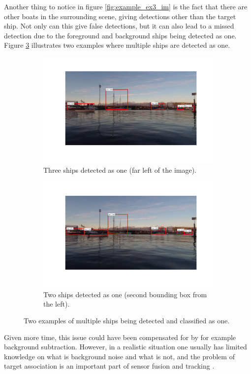 Another thing to notice in figure \ref{fig:example_ex3_im} is the fact that there are other boats in the surrounding scene, giving detections other than the target ship. Not only can this give false detections, but it can also lead to a missed detection due to the foreground and background ships being detected as one. Figure \ref{fig:issues_multiple_detections} illustrates two examples where multiple ships are detected as one. 
\begin{figure}
	\centering
	\begin{subfigure}[t]{.5\textwidth}
		\centering
		\includegraphics[width=\linewidth]{fig/issue_overlapping.png}
		\caption{Three ships detected as one (far left of the image).}
		\label{fig:sub_issue1}
	\end{subfigure}%
	\begin{subfigure}[t]{.5\textwidth}
		\centering
		\includegraphics[width=\linewidth]{fig/issue_2.png}
		\caption{Two ships detected as one (second bounding box from the left).}
		\label{fig:sub_issue2}
	\end{subfigure}
	\caption{Two examples of multiple ships being detected and classified as one.}
	\label{fig:issues_multiple_detections}
\end{figure} 
Given more time, this issue could have been compensated for by for example background subtraction. However, in a realistic situation one usually has limited knowledge on what is background noise and what is not, and the problem of target association is an important part of sensor fusion and tracking . 
\cleardoublepage